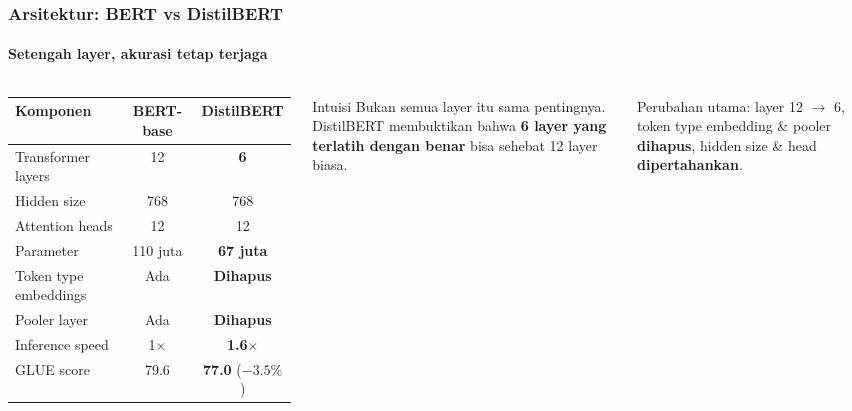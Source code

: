 \documentclass[t,aspectratio=169,xcolor=dvipsnames]{beamer}
\begin{document}
\begin{frame}
    \frametitle{Arsitektur: BERT vs DistilBERT}
    \framesubtitle{Setengah layer, akurasi tetap terjaga}
    \small
    \begin{columns}[T]
        \footnotesize
        \setlength{\tabcolsep}{5pt}
        \begin{tabular}{lcc}
            \toprule
            \textbf{Komponen}        & \textbf{BERT-base} & \textbf{DistilBERT} \\
            \midrule
            Transformer layers       & 12                 & \textbf{6} \\
            Hidden size              & 768                & 768 \\
            Attention heads          & 12                 & 12 \\
            Parameter                & 110 juta           & \textbf{67 juta} \\
            Token type embeddings    & Ada                & \textbf{Dihapus} \\
            Pooler layer             & Ada                & \textbf{Dihapus} \\
            \midrule
            Inference speed          & 1$\times$          & \textbf{1.6$\times$} \\
            GLUE score               & 79.6               & \textbf{77.0} ($-3.5\%$) \\
            \bottomrule
        \end{tabular}

        \begin{exampleblock}{Intuisi}
            \footnotesize
            Bukan semua layer itu sama pentingnya. DistilBERT membuktikan bahwa \textbf{6 layer yang terlatih dengan benar} bisa sehebat 12 layer biasa.
        \end{exampleblock}

        \vspace{0.4em}
        \footnotesize
        Perubahan utama: layer 12 $\to$ 6, token type embedding \& pooler \textbf{dihapus}, hidden size \& head \textbf{dipertahankan}.
    \end{columns}
\end{frame}
\end{document}
